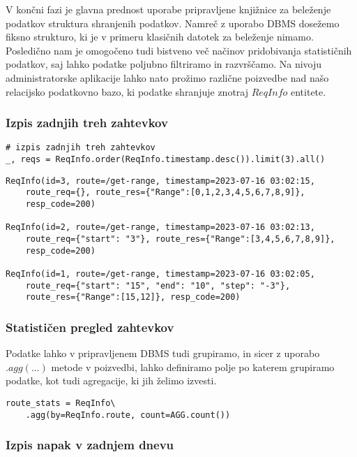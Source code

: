 \documentclass[a4paper,12pt,openright]{book}
\begin{document}
    V končni fazi je glavna prednost uporabe pripravljene knjižnice za beleženje podatkov struktura shranjenih podatkov. Namreč z uporabo DBMS dosežemo fiksno strukturo, ki je v primeru klasičnih datotek za beleženje nimamo. Posledično nam je omogočeno tudi bistveno več načinov pridobivanja statističnih podatkov, saj lahko podatke poljubno filtriramo in razvrščamo. Na nivoju administratorske aplikacije lahko nato prožimo različne poizvedbe nad našo relacijsko podatkovno bazo, ki podatke shranjuje znotraj $ReqInfo$ entitete.

    \subsubsection{Izpis zadnjih treh zahtevkov}

\begin{verbatim}
# izpis zadnjih treh zahtevkov
_, reqs = ReqInfo.order(ReqInfo.timestamp.desc()).limit(3).all()
\end{verbatim}

\begin{verbatim}
ReqInfo(id=3, route=/get-range, timestamp=2023-07-16 03:02:15, 
    route_req={}, route_res={"Range":[0,1,2,3,4,5,6,7,8,9]},
    resp_code=200)
    
ReqInfo(id=2, route=/get-range, timestamp=2023-07-16 03:02:13, 
    route_req={"start": "3"}, route_res={"Range":[3,4,5,6,7,8,9]},
    resp_code=200)
    
ReqInfo(id=1, route=/get-range, timestamp=2023-07-16 03:02:05,
    route_req={"start": "15", "end": "10", "step": "-3"},
    route_res={"Range":[15,12]}, resp_code=200)
\end{verbatim}

    \subsubsection{Statističen pregled zahtevkov}

    Podatke lahko v pripravljenem DBMS tudi grupiramo, in sicer z uporabo $.agg(...)$ metode v poizvedbi, lahko definiramo polje po katerem grupiramo podatke, kot tudi agregacije, ki jih želimo izvesti.
    
\begin{verbatim}
route_stats = ReqInfo\
    .agg(by=ReqInfo.route, count=AGG.count())
\end{verbatim}

    \subsubsection{Izpis napak v zadnjem dnevu}
\end{document}
